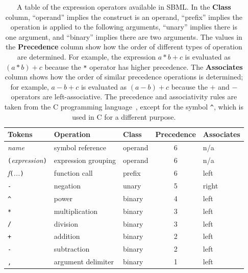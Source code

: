 \documentclass[10pt]{cekarticle}
\newcommand{\changed}[1]{\textcolor{BrickRed}{#1}}
\begin{document}
\begin{table}[tbh]
  \vspace*{8pt}
  \begin{center}
    \begin{tabular}{lllcl}
      \toprule
      \textbf{Tokens} & \textbf{Operation} & \textbf{Class} & \textbf{Precedence} & \textbf{Associates} \\
      \midrule
      \emph{name} & symbol reference & operand & \changed{6} & n/a \\
      \texttt{(}\emph{expression}\texttt{)} & expression grouping & operand & \changed{6} & n/a\\
      \emph{f}\texttt{(}\emph{...}\texttt{)} & function call & prefix & \changed{6} & left\\
      \texttt{-} & negation & unary & \changed{5} & right\\
      \verb|^| & power & binary & \changed{4} & left \\
      \texttt{*} & multiplication & binary & \changed{3} & left\\
      \texttt{/} & division & binary & \changed{3} & left\\
      \texttt{+} & addition & binary & \changed{2} & left\\
      \texttt{-} & subtraction & binary & \changed{2} & left\\
      \changed{\texttt{,}} & \changed{argument delimiter} & \changed{binary} & \changed{1} & \changed{left}\\
      \bottomrule
    \end{tabular}
    \vspace*{-3pt}
  \end{center}
  \caption{A table of the expression operators available in SBML.  In the
    \textbf{\textrm{Class}} column, ``operand'' implies the construct is an
    operand, ``prefix'' implies the operation is applied to the following
    arguments, ``unary'' implies there is one argument, and ``binary''
    implies there are two arguments.  The values in the
    \textbf{\textrm{Precedence}} column show how the order of different
    types of operation are determined.  For example, the expression $a * b
    + c$ is evaluated as $(a * b) + c$ because the \texttt{*} operator has
    higher precedence.  The \textbf{\textrm{Associates}} column shows how
    the order of similar precedence operations is determined; for example,
    $a - b + c$ is evaluated as $(a - b) + c$ because the $+$ and $-$
    operators are left-associative.  The precedence and associativity rules
    are taken from the C programming language~\protect\citep{harbison:1995,kernighan:1988},
    except for the symbol \texttt{\^}, which is used in C for a different
    purpose.}
  \label{tab:operators}
\end{table}
\end{document}
